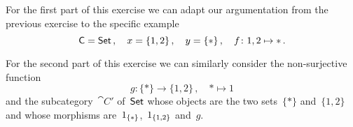 \subsection{}

For the first part of this exercise we can adapt our argumentation from the previous exercise to the specific example
\[
	\mathsf{C} = \mathsf{Set} \,,
	\quad
	x = \{ 1, 2 \} \,,
	\quad
	y = \{ \ast \} \,,
	\quad
	f \colon 1, 2 \mapsto \ast \,.
\]

For the second part of this exercise we can similarly consider the non-surjective function
\[
	g
	\colon
	\{ \ast \} \to \{ 1, 2 \} \,,
	\quad
	\ast \mapsto 1
\]
and the subcategory~$\cat{C}'$ of~$\mathsf{Set}$ whose objects are the two sets~$\{ \ast \}$ and~$\{ 1, 2 \}$ and whose morphisms are~$1_{\{ \ast \}}$,~$1_{\{ 1, 2 \}}$ and~$g$.
